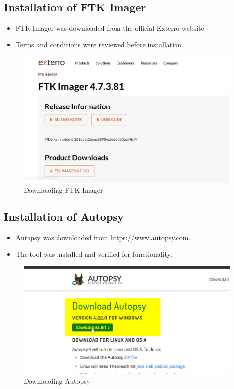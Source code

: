 \documentclass[11pt]{article}
\begin{document}
\subsection{Installation of FTK Imager}
\begin{itemize}
    \item FTK Imager was downloaded from the official Exterro website.
    \item Terms and conditions were reviewed before installation.
\end{itemize}
\begin{figure}[H]
    \centering
    \includegraphics[width=0.99\textwidth]{ftk.jpg}
    \caption{Downloading FTK Imager}
    \label{fig:1}
\end{figure}

\subsection{Installation of Autopsy}
\begin{itemize}
    \item Autopsy was downloaded from \href{https://www.autopsy.com}{https://www.autopsy.com}.
    \item The tool was installed and verified for functionality.
\end{itemize}
\begin{figure}[H]
    \centering
    \includegraphics[width=0.99\textwidth]{autopsy.jpg}
    \caption{Downloading Autopsy}
    \label{fig:1}
\end{figure}
\end{document}
